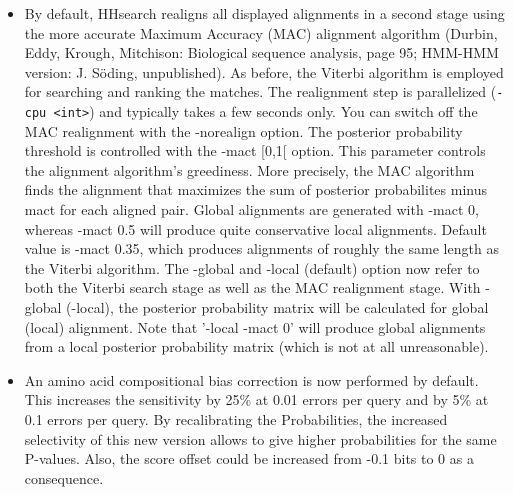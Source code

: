 \documentclass[11pt,a4paper]{article}
\begin{document}
\begin{itemize}

\item{By default, HHsearch realigns all displayed alignments in a second stage 
  using the more accurate Maximum Accuracy (MAC) alignment algorithm 
  (Durbin, Eddy, Krough, Mitchison: Biological sequence analysis, page 95;
  HMM-HMM version: J. S\"oding, unpublished). As before, the Viterbi algorithm 
  is employed for searching and ranking the matches. The realignment step is 
  parallelized (\verb`-cpu <int>`) and typically takes a few seconds only. You can 
  switch off the MAC realignment with the -norealign option. 
     The posterior probability threshold is controlled with the -mact [0,1[ 
  option. This parameter controls the alignment algorithm's greediness. More 
  precisely, the MAC algorithm finds the alignment that maximizes the sum of 
  posterior probabilites minus mact for each aligned pair. Global alignments 
  are generated with -mact 0, whereas -mact 0.5 will produce quite conservative
  local alignments. Default value is -mact 0.35, which produces alignments of
  roughly the same length as the Viterbi algorithm. 
     The -global and -local (default) option now refer to both the Viterbi search 
  stage as well as the MAC realignment stage. With -global (-local), the 
  posterior probability matrix will be calculated for global (local) 
  alignment. Note that '-local -mact 0' will produce global alignments from
  a local posterior probability matrix (which is not at all unreasonable).
}
\item{An amino acid compositional bias correction is now performed by default.
  This increases the sensitivity by 25\% at 0.01 errors per query and by 5\% at 
  0.1 errors per query. By recalibrating the Probabilities, the increased 
  selectivity of this new version allows to give higher probabilities for the 
  same P-values. Also, the score offset could be increased from -0.1 bits to 0 
  as a consequence. 
}


\end{itemize}
\end{document}
